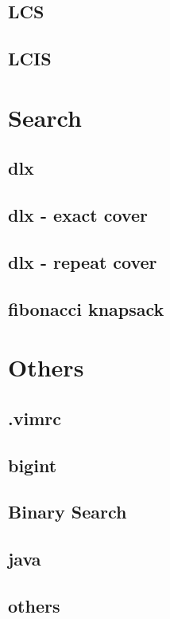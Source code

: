 \documentclass[a4paper,5pt,twocolumn,titlepage]{article}
\begin{document}
\subsection{LCS}

\subsection{LCIS}


\section{Search}
\subsection{dlx}

\subsection{dlx - exact cover}

\subsection{dlx - repeat cover}

\subsection{fibonacci knapsack}


\section{Others}
\subsection{.vimrc}

\subsection{bigint}

\subsection{Binary Search}

\subsection{java}

\subsection{others}

\end{document}
